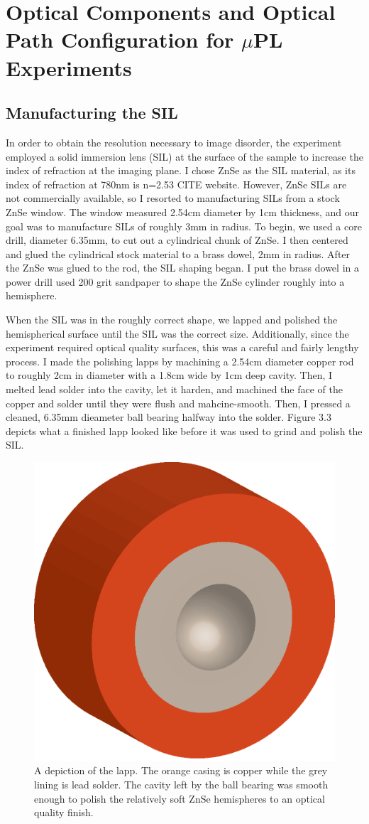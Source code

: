 \section{Optical Components and Optical Path Configuration for $\mu$PL Experiments}

\subsection{Manufacturing the SIL}

\indent In order to obtain the resolution necessary to image disorder, the experiment employed a solid immersion lens (SIL) at the surface of the sample to increase the index of refraction at the imaging plane. I chose ZnSe as the SIL material, as its index of refraction at 780nm is n=2.53 CITE website. However, ZnSe SILs are not commercially available, so I resorted to manufacturing SILs from a stock ZnSe window. The window measured 2.54cm diameter by 1cm thickness, and our goal was to manufacture SILs of roughly 3mm in radius. To begin, we used a core drill, diameter 6.35mm, to cut out a cylindrical chunk of ZnSe. I then centered and glued the cylindrical stock material to a brass dowel, 2mm in radius. After the ZnSe was glued to the rod, the SIL shaping began. I put the brass dowel in a power drill used 200 grit sandpaper to shape the ZnSe cylinder roughly into a hemisphere.

\indent  When the SIL was in the roughly correct shape, we lapped and polished the hemispherical surface until the SIL was the correct size. Additionally, since the experiment required optical quality surfaces, this was a careful and fairly lengthy process. I made the polishing lapps by machining a 2.54cm diameter copper rod to roughly 2cm in diameter with a 1.8cm wide by 1cm deep cavity. Then, I melted lead solder into the cavity, let it harden, and machined the face of the copper and solder until they were flush and mahcine-smooth. Then, I pressed a cleaned, 6.35mm dieameter ball bearing halfway into the solder. Figure 3.3 depicts what a finished lapp looked like before it was used to grind and polish the SIL. 

\begin{figure}[h!]
\centering
\includegraphics[width = .3\textwidth]{lapp.eps}
\caption{ \doublespacing A depiction of the lapp. The orange casing is copper while the grey lining is lead solder. The cavity left by the ball bearing was smooth enough to polish the relatively soft ZnSe hemispheres to an optical quality finish.}
\label{lapp}
\end{figure}



